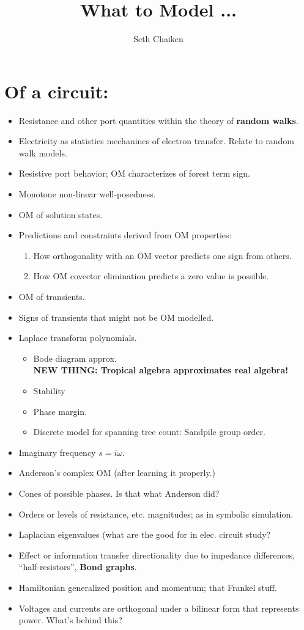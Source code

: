 \documentclass{article}
\title{What to Model ... }
\author{Seth Chaiken}
\begin{document}
\maketitle

\section{Of a circuit:}
\begin{itemize}
\item Resistance and other port quantities within the theory of 
\textbf{random walks}\cite{DoyleSnellRandom,ProbOnTreesNetworks}.
\item Electricity as statistics mechanincs of electron transfer.  Relate to 
random walk models.
\item Resistive port behavior; OM characterizes of 
forest term sign.
\item Monotone non-linear well-posedness.
\item OM of solution states.
\item Predictions and constraints derived from OM properties:
\begin{enumerate}
\item How orthogonality with an OM vector predicts one sign from others.
\item How OM covector elimination predicts a zero value is possible.
\end{enumerate}
\item OM of transients.
\item Signs of transients that might not be OM modelled.
\item Laplace transform polynomials.
\begin{itemize}
\item Bode diagram approx.\\
\textbf{NEW THING: Tropical algebra approximates real algebra!}
\item Stability
\item Phase margin.
\item Discrete model for spanning tree count: Sandpile group order.
\end{itemize}

\item Imaginary frequency $s=i\omega$.
\item Anderson's complex OM (after learning it properly.)
\item Cones of possible phases.  Is that what Anderson did?
\item Orders or levels of resistance, etc. magnitudes; as
in symbolic simulation.
\item Laplacian eigenvalues (what are the good for in elec. circuit
study?
\item Effect or information transfer directionality due to impedance
differences, ``half-resistors'',  \textbf{Bond graphs}.
\item Hamiltonian generalized position and momentum; that Frankel stuff.
\item Voltages and currents are orthogonal under a bilinear form that 
represents power.  What's behind this?
\end{itemize}
\end{document}

